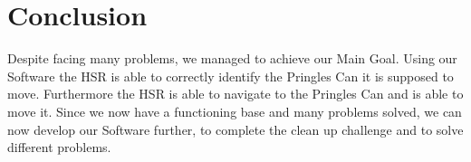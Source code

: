 \documentclass[main.tex]{subfiles}
\begin{document}
	
	\chapter{Conclusion}
	Despite facing many problems, we managed to achieve our Main Goal.
	Using our Software the HSR is able to correctly identify the Pringles Can it is supposed to move.
	Furthermore the HSR is able to navigate to the Pringles Can and is able to move it.
	Since we now have a functioning base and many problems solved, we can now develop our Software further, to complete the clean up challenge and to solve different problems.
	
\end{document}
